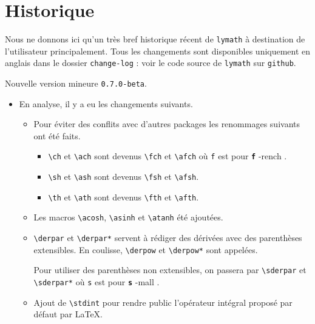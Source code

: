 \documentclass[12pt,a4paper]{article}
\newcommand\env[1]{\texttt{#1}}
\newcommand\macro[1]{\env{\textbackslash{}#1}}
\theoremstyle{definition}
\newcommand\whyprefix[2]{%
	\textbf{\prefix{#1}}-#2%
}
\newcommand\prefix[1]{%
	\texttt{#1}%
}
\begin{document}
\section{Historique}

Nous ne donnons ici qu'un très bref historique récent de \verb+lymath+ à destination de l'utilisateur principalement.
Tous les changements sont disponibles uniquement en anglais dans le dossier \verb+change-log+ : voir le code source de \verb+lymath+ sur \verb+github+.

\begin{description}

    \medskip
    \item[2020-06-08] Nouvelle version mineure \verb+0.7.0-beta+.
    
    \begin{itemize}[itemsep=.5em]
        \item En analyse, il y a eu les changements suivants.
        \begin{itemize}[itemsep=.5em]
            \item Pour éviter des conflits avec d'autres packages les renommages suivants ont été faits.
            \begin{itemize}[itemsep=.5em]
                \item \macro{ch} et \macro{ach} sont devenus \macro{fch} et \macro{afch} où \prefix{f} est pour \whyprefix{f}{rench}.
    
                \item \macro{sh} et \macro{ash} sont devenus \macro{fsh} et \macro{afsh}.
    
                \item \macro{th} et \macro{ath} sont devenus \macro{fth} et \macro{afth}.
            \end{itemize}
    
    		\item Les macros \macro{acosh}, \macro{asinh} et \macro{atanh} été ajoutées.
    
     		\item \macro{derpar} et \macro{derpar*} servent à rédiger des dérivées avec des parenthèses extensibles. En coulisse, \macro{derpow} et \macro{derpow*} sont appelées.
    
            Pour utiliser des parenthèses non extensibles, on passera par \macro{sderpar} et \macro{sderpar*} où \prefix{s} est pour \whyprefix{s}{mall}.
    
    		\item Ajout de \macro{stdint} pour rendre public l'opérateur intégral proposé par défaut par \LaTeX.
        \end{itemize}
    

\end{itemize}
\end{description}
\end{document}
